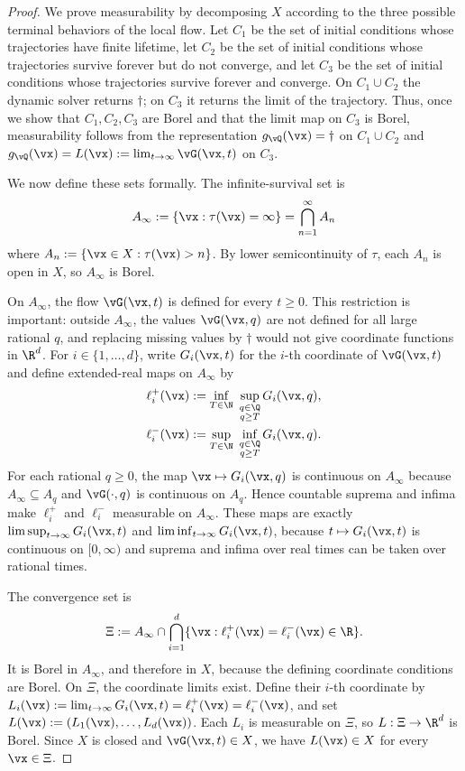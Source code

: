 \propMeasurable*
\begin{proof}\label{proof:measurable}
We prove measurability by decomposing $X$ according to the three possible
terminal behaviors of the local flow. Let $C_1$ be the set of initial
conditions whose trajectories have finite lifetime, let $C_2$ be the set of
initial conditions whose trajectories survive forever but do not converge, and
let $C_3$ be the set of initial conditions whose trajectories survive forever
and converge. On $C_1\cup C_2$ the dynamic solver returns $\dagger$; on $C_3$
it returns the limit of the trajectory. Thus, once we show that
$C_1,C_2,C_3$ are Borel and that the limit map on $C_3$ is Borel,
measurability follows from the representation
$g_{\vQ}(\vx)=\dagger$ on $C_1\cup C_2$ and
$g_{\vQ}(\vx)=L(\vx):=\lim_{t\to\infty}\vG(\vx,t)$ on $C_3$.

We now define these sets formally. The infinite-survival set is
\[
A_\infty:=\{\vx:\tau(\vx)=\infty\}=\bigcap_{n=1}^\infty A_n
\]
where $A_n:=\{\vx\in X:\tau(\vx)>n\}$. By lower semicontinuity of $\tau$, each
$A_n$ is open in $X$, so $A_\infty$ is Borel.

On $A_\infty$, the flow $\vG(\vx,t)$ is defined for every $t\ge 0$. This
restriction is important: outside $A_\infty$, the values $\vG(\vx,q)$ are not
defined for all large rational $q$, and replacing missing values by $\dagger$
would not give coordinate functions in $\R^d$. For $i\in\{1,\dots,d\}$, write
$G_i(\vx,t)$ for the $i$-th coordinate of $\vG(\vx,t)$ and define
extended-real maps on $A_\infty$ by
\begin{align*}
\ell_i^+(\vx)
&:= \inf_{T\in\N}\ \sup_{\substack{q\in\Q\\ q\ge T}} G_i(\vx,q),\\
\ell_i^-(\vx)
&:= \sup_{T\in\N}\ \inf_{\substack{q\in\Q\\ q\ge T}} G_i(\vx,q).
\end{align*}
For each rational $q\ge 0$, the map $\vx\mapsto G_i(\vx,q)$ is continuous on
$A_\infty$ because $A_\infty\subseteq A_q$ and $\vG(\cdot,q)$ is continuous on
$A_q$. Hence countable suprema and infima make $\ell_i^+$ and $\ell_i^-$
measurable on $A_\infty$. These maps are exactly
$\limsup_{t\to\infty}G_i(\vx,t)$ and
$\liminf_{t\to\infty}G_i(\vx,t)$, because
$t\mapsto G_i(\vx,t)$ is continuous on $[0,\infty)$ and suprema and infima over
real times can be taken over rational times.

The convergence set is
\[
\Xi:=A_\infty\cap
\bigcap_{i=1}^d
\{\vx:\ell_i^+(\vx)=\ell_i^-(\vx)\in\R\}.
\]
It is Borel in $A_\infty$, and therefore in $X$, because the defining
coordinate conditions are Borel. On $\Xi$, the coordinate limits exist. Define
their $i$-th coordinate by
$L_i(\vx):=\lim_{t\to\infty}G_i(\vx,t)=\ell_i^+(\vx)=\ell_i^-(\vx)$, and set
$L(\vx):=(L_1(\vx),\dots,L_d(\vx))$.
Each $L_i$ is measurable on $\Xi$, so $L:\Xi\to\R^d$ is Borel. Since $X$ is
closed and $\vG(\vx,t)\in X$, we have $L(\vx)\in X$ for every $\vx\in\Xi$.


\end{proof}
